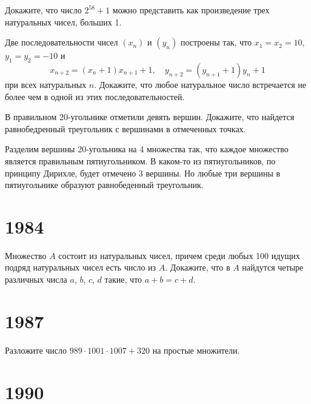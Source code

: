 \documentclass[11pt, a4paper]{problems_template}
\begin{document}
\begin{exercise}[17]
Докажите, что число $2^{58} + 1$ можно представить как произведение трех натуральных чисел, больших 1.
\end{exercise}

\begin{exercise}[31]
Две последовательности чисел $(x_{n})$ и $(y_{n})$ построены так, что $x_{1} = x_{2} = 10$, $y_{1} = y_{2} = -10$ и
$$
x_{n+2}=(x_{n}+1)x_{n+1}+1, \quad y_{n+2}=(y_{n+1} + 1)y_{n}+1
$$
при всех натуральных $n$. Докажите, что любое натуральное число встречается не более чем в одной из этих последовательностей.
\end{exercise}

\begin{exercise}[37]
В правильном 20-угольнике отметили девять вершин. Докажите, что найдется равнобедренный треугольник с вершинами в отмеченных точках.
\end{exercise}

\begin{Solution}
Разделим вершины 20-угольника на 4 множества так, что каждое множество является правильным пятиугольником. В каком-то из пятиугольников, по принципу Дирихле, будет отмечено 3 вершины. Но любые три вершины в пятиугольнике образуют равнобеденный треугольник.
\end{Solution}

\chapter{1984}

\begin{exercise}
Множество $A$ состоит из натуральных чисел, причем среди любых 100 идущих подряд натуральных чисел есть число из $A$. Докажите, что в $A$ найдутся четыре различных числа $a$, $b$, $c$, $d$ такие, что $a + b = c + d$.
\end{exercise}

\chapter{1987}

\begin{exercise}[42]
Разложите число $989 \cdot 1001 \cdot 1007 + 320$ на простые множители.
\end{exercise}

\chapter{1990}
\end{document}
